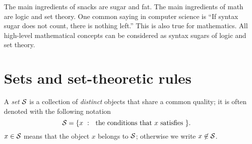 




\begin{rem}
The main ingredients of snacks are sugar and fat.
The main ingredients of math are logic and set theory.
One common saying in computer science is 
  ``If syntax sugar does not count, there is nothing left.''
  This is also true for mathematics. 
  All high-level mathematical concepts
  can be considered as syntax sugars
  of logic and set theory.
\end{rem}

\section{Sets and set-theoretic rules}
\label{sec:sets-set-theoretic}

\begin{defn}
  \label{def:setNotation}
  A \emph{set} ${\cal S}$
  is a collection of \emph{distinct} objects
   that share a common quality; 
   it is often denoted with the following notation
   \begin{equation}
     \label{eq:setNotation}
     {\cal S} = \{ x\ :\ \text{ the conditions that $x$ satisfies } \}.
   \end{equation}
   $x\in {\cal S}$ means that the object $x$ belongs to ${\cal S}$;
   otherwise we write $x\not\in {\cal S}$. 
\end{defn}

